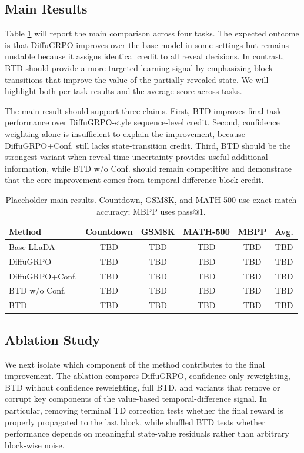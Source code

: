 \documentclass[letterpaper]{article}
\begin{document}
\subsection{Main Results}

Table \ref{tab:main_results} will report the main comparison across four tasks. The expected outcome is that DiffuGRPO improves over the base model in some settings but remains unstable because it assigns identical credit to all reveal decisions. In contrast, BTD should provide a more targeted learning signal by emphasizing block transitions that improve the value of the partially revealed state. We will highlight both per-task results and the average score across tasks.

The main result should support three claims. First, BTD improves final task performance over DiffuGRPO-style sequence-level credit. Second, confidence weighting alone is insufficient to explain the improvement, because DiffuGRPO+Conf. still lacks state-transition credit. Third, BTD should be the strongest variant when reveal-time uncertainty provides useful additional information, while BTD w/o Conf. should remain competitive and demonstrate that the core improvement comes from temporal-difference block credit.

\begin{table}[t]
\centering
\small
\begin{tabular}{lccccc}
\hline
Method & Countdown & GSM8K & MATH-500 & MBPP & Avg. \\
\hline
Base LLaDA & TBD & TBD & TBD & TBD & TBD \\
DiffuGRPO & TBD & TBD & TBD & TBD & TBD \\
DiffuGRPO+Conf. & TBD & TBD & TBD & TBD & TBD \\
BTD w/o Conf. & TBD & TBD & TBD & TBD & TBD \\
BTD & TBD & TBD & TBD & TBD & TBD \\
\hline
\end{tabular}
\caption{Placeholder main results. Countdown, GSM8K, and MATH-500 use exact-match accuracy; MBPP uses pass@1.}
\label{tab:main_results}
\end{table}

\subsection{Ablation Study}

We next isolate which component of the method contributes to the final improvement. The ablation compares DiffuGRPO, confidence-only reweighting, BTD without confidence reweighting, full BTD, and variants that remove or corrupt key components of the value-based temporal-difference signal. In particular, removing terminal TD correction tests whether the final reward is properly propagated to the last block, while shuffled BTD tests whether performance depends on meaningful state-value residuals rather than arbitrary block-wise noise.
\end{document}
